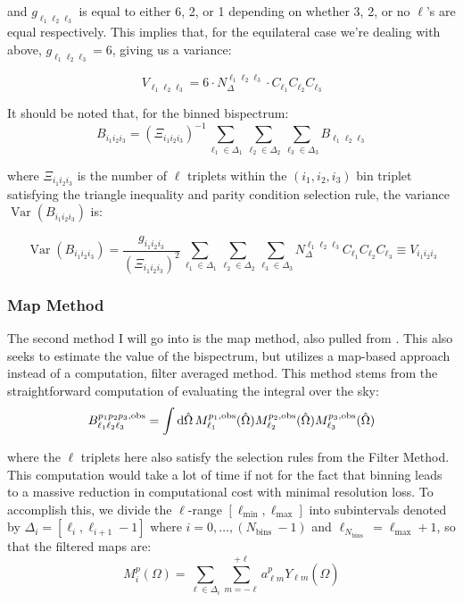 \documentclass[11pt]{article}
\renewcommand{\_}[1]{\underline{ #1 }}
\newcommand{\npar}{\vspace{.3cm}\newline}
\begin{document}
{and $g_{\ell_1 \ell_2 \ell_3}$ is equal to either 6, 2, or 1 depending on whether 3, 2, or no $\ell$'s are equal respectively. This implies that, for the equilateral case we're dealing with above, $g_{\ell_1 \ell_2 \ell_3} = 6$, giving us a variance:

\begin{equation}
    V_{\ell_1 \ell_2 \ell_3} = 6 \cdot N_{\Delta}^{\ell_1 \ell_2 \ell_3} \cdot C_{\ell_1} C_{\ell_2} C_{\ell_3}
\end{equation}

It should be noted that, for the binned bispectrum:
\begin{equation}
    B_{i_1 i_2 i_3} = (\Xi_{i_1 i_2 i_3})^{-1} \sum_{\ell_1\in\Delta_1}\sum_{\ell_2\in\Delta_2}\sum_{\ell_3\in\Delta_3} B_{\ell_1 \ell_2 \ell_3}
\end{equation}

where $\Xi_{i_1 i_2 i_3}$ is the number of $\ell$ triplets within the $(i_1,i_2,i_3)$ bin triplet satisfying the triangle inequality and parity condition selection rule, the variance $\operatorname{Var} (B_{i_1 i_2 i_3})$ is:

\begin{equation}
    \operatorname{Var} (B_{i_1 i_2 i_3}) = \frac{g_{i_1 i_2 i_3}}{(\Xi_{i_1 i_2 i_3})^2} \sum_{\ell_1\in\Delta_1}\sum_{\ell_2\in\Delta_2}\sum_{\ell_3\in\Delta_3} N_{\Delta}^{\ell_1 \ell_2 \ell_3} C_{\ell_1} C_{\ell_2} C_{\ell_3} \equiv V_{i_1 i_2 i_3}
\end{equation}


\subsubsection{Map Method}\label{mapmethod}

The second method I will go into is the map method, also pulled from \cite{Bucher_2016}. This also seeks to estimate the value of the bispectrum, but utilizes a map-based approach instead of a computation, filter averaged method.
\npar
This method stems from the straightforward computation of evaluating the integral over the sky:
\begin{equation}
    B_{\ell_1 \ell_2 \ell_3}^{p_1 p_2 p_3, \rm{obs}} = \int \dd{\hat{\Omega}} M_{\ell_1}^{p_1, \rm{obs}}(\hat{\Omega}) M_{\ell_2}^{p_2, \rm{obs}}(\hat{\Omega}) M_{\ell_3}^{p_3, \rm{obs}}(\hat{\Omega})
\end{equation}

where the $\ell$ triplets here also satisfy the selection rules from the Filter Method. This computation would take a lot of time if not for the fact that binning leads to a massive reduction in computational cost with minimal resolution loss. To accomplish this, we divide the $\ell$-range $\left[\ell_{\min }, \ell_{\max }\right]$ into subintervals denoted by $\Delta_i=\left[\ell_i, \ell_{i+1}-1\right]$ where $i=0, \ldots,\left(N_{\text {bins }}-1\right)$ and $\ell_{N_{\text {bins }}}=\ell_{\max }+1$, so that the filtered maps are:
\begin{equation}
M_i^p(\Omega)=\sum_{\ell \in \Delta_i} \sum_{m=-\ell}^{+\ell} a_{\ell m}^p Y_{\ell m}(\hat{\Omega})
\end{equation}

}
\end{document}
